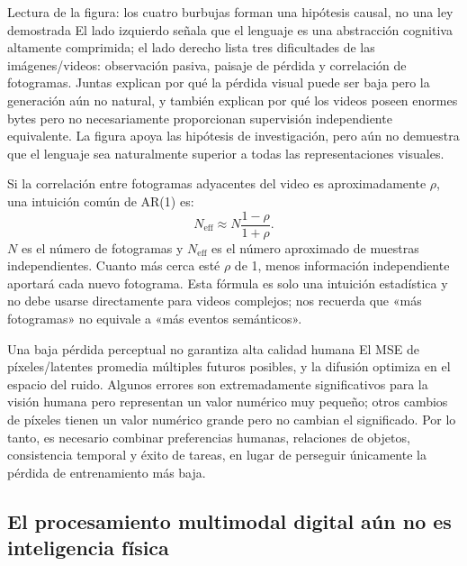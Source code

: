 \begin{knowledgebox}{Lectura de la figura: los cuatro burbujas forman una hipótesis causal, no una ley demostrada}
El lado izquierdo señala que el lenguaje es una abstracción cognitiva altamente comprimida; el lado derecho lista tres dificultades de las imágenes/videos: observación pasiva, paisaje de pérdida y correlación de fotogramas. Juntas explican por qué la pérdida visual puede ser baja pero la generación aún no natural, y también explican por qué los videos poseen enormes bytes pero no necesariamente proporcionan supervisión independiente equivalente. La figura apoya las hipótesis de investigación, pero aún no demuestra que el lenguaje sea naturalmente superior a todas las representaciones visuales.
\end{knowledgebox}

Si la correlación entre fotogramas adyacentes del video es aproximadamente $\rho$, una intuición común de AR(1) es:
$$
N_{\text{eff}}\approx N\frac{1-\rho}{1+\rho}.
$$
$N$ es el número de fotogramas y $N_{\text{eff}}$ es el número aproximado de muestras independientes. Cuanto más cerca esté $\rho$ de 1, menos información independiente aportará cada nuevo fotograma. Esta fórmula es solo una intuición estadística y no debe usarse directamente para videos complejos; nos recuerda que «más fotogramas» no equivale a «más eventos semánticos».

\begin{warningbox}{Una baja pérdida perceptual no garantiza alta calidad humana}
El MSE de píxeles/latentes promedia múltiples futuros posibles, y la difusión optimiza en el espacio del ruido. Algunos errores son extremadamente significativos para la visión humana pero representan un valor numérico muy pequeño; otros cambios de píxeles tienen un valor numérico grande pero no cambian el significado. Por lo tanto, es necesario combinar preferencias humanas, relaciones de objetos, consistencia temporal y éxito de tareas, en lugar de perseguir únicamente la pérdida de entrenamiento más baja.
\end{warningbox}


\subsection{El procesamiento multimodal digital aún no es inteligencia física}

